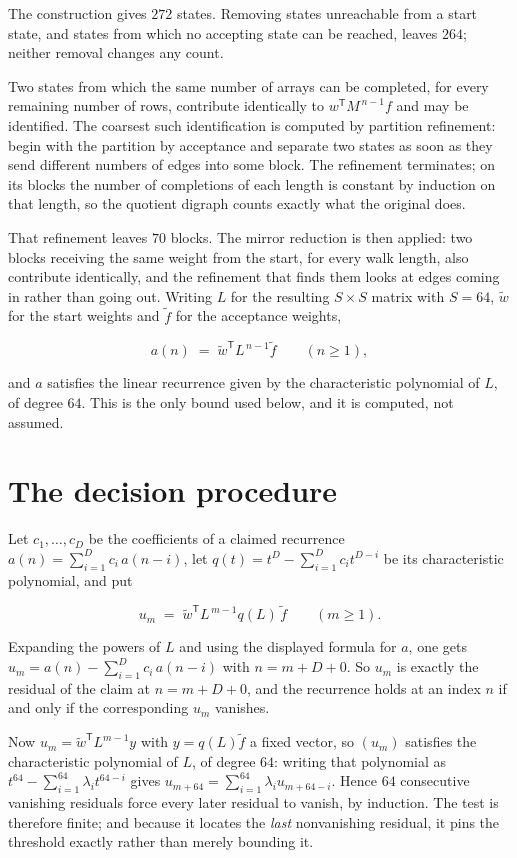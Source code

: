 \documentclass[11pt]{article}
\theoremstyle{definition}
\begin{document}
The construction gives $272$ states. Removing states unreachable from a start state, and states from which no accepting state can be reached, leaves $264$; neither removal changes any count.

Two states from which the same number of arrays can be completed, for every remaining number of rows, contribute identically to $w^{\mathsf T}M^{\,n-1}f$ and may be identified. The coarsest such identification is computed by partition refinement: begin with the partition by acceptance and separate two states as soon as they send different numbers of edges into some block. The refinement terminates; on its blocks the number of completions of each length is constant by induction on that length, so the quotient digraph counts exactly what the original does.

That refinement leaves $70$ blocks. The mirror reduction is then applied: two blocks receiving the same weight from the start, for every walk length, also contribute identically, and the refinement that finds them looks at edges coming in rather than going out. Writing $L$ for the resulting $S \times S$ matrix with $S = 64$, $\tilde w$ for the start weights and $\tilde f$ for the acceptance weights,

\[a(n) \;=\; \tilde w^{\mathsf T} L^{\,n-1} \tilde f \qquad (n \ge 1),\]

and $a$ satisfies the linear recurrence given by the characteristic polynomial of $L$, of degree $64$. This is the only bound used below, and it is computed, not assumed.

\section{The decision procedure}

Let $c_1,\dots,c_D$ be the coefficients of a claimed recurrence $a(n) = \sum_{i=1}^{D} c_i\,a(n-i)$, let $q(t) = t^{D} - \sum_{i=1}^{D} c_i t^{D-i}$ be its characteristic polynomial, and put

\[u_m \;=\; \tilde w^{\mathsf T} L^{\,m-1} q(L)\,\tilde f \qquad (m \ge 1).\]

Expanding the powers of $L$ and using the displayed formula for $a$, one gets $u_m = a(n) - \sum_{i=1}^{D} c_i\,a(n-i)$ with $n = m + D + 0$. So $u_m$ is exactly the residual of the claim at $n = m + D + 0$, and the recurrence holds at an index $n$ if and only if the corresponding $u_m$ vanishes.

Now $u_m = \tilde w^{\mathsf T} L^{m-1} y$ with $y = q(L)\tilde f$ a fixed vector, so $(u_m)$ satisfies the characteristic polynomial of $L$, of degree $64$: writing that polynomial as $t^{64} - \sum_{i=1}^{64} \lambda_i t^{64-i}$ gives $u_{m+64} = \sum_{i=1}^{64} \lambda_i u_{m+64-i}$. Hence $64$ consecutive vanishing residuals force every later residual to vanish, by induction. The test is therefore finite; and because it locates the {\itshape last} nonvanishing residual, it pins the threshold exactly rather than merely bounding it.
\end{document}
